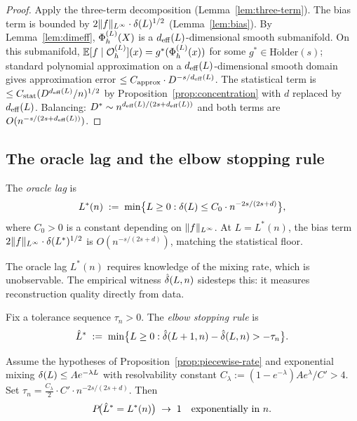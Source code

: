 \begin{proof}
Apply the three-term decomposition (Lemma~\ref{lem:three-term}).
The bias term is bounded by $2\|f\|_{L^{\infty}} \cdot \delta(L)^{1/2}$
(Lemma~\ref{lem:bias}).
By Lemma~\ref{lem:dimeff}, $\Phi_h^{(L)}(X)$ is a $d_{\mathrm{eff}}(L)$-dimensional smooth
submanifold.
On this submanifold, $\mathbb{E}[f \mid \mathcal{O}_h^{(L)}](x) = g^*(\Phi_h^{(L)}(x))$ for some
$g^* \in \mathrm{H\ddot{o}lder}(s)$; standard polynomial approximation on a
$d_{\mathrm{eff}}(L)$-dimensional smooth domain gives approximation error
$\leq C_{\mathrm{approx}} \cdot D^{-s/d_{\mathrm{eff}}(L)}$.
The statistical term is $\leq C_{\mathrm{stat}}(D^{d_{\mathrm{eff}}(L)}/n)^{1/2}$ by
Proposition~\ref{prop:concentration} with $d$ replaced by $d_{\mathrm{eff}}(L)$.
Balancing: $D^* \sim n^{d_{\mathrm{eff}}(L)/(2s+d_{\mathrm{eff}}(L))}$ and both terms are
$O(n^{-s/(2s+d_{\mathrm{eff}}(L))})$.
\end{proof}

\subsection{The oracle lag and the elbow stopping rule}

\begin{definition}
\label{def:oracle-lag}
The \emph{oracle lag} is
\[
  L^*(n) \;:=\; \min\bigl\{L \geq 0 : \delta(L) \leq C_0 \cdot n^{-2s/(2s+d)}\bigr\},
\]
where $C_0 > 0$ is a constant depending on $\|f\|_{L^{\infty}}$.
At $L = L^*(n)$, the bias term $2\|f\|_{L^{\infty}} \cdot \delta(L^*)^{1/2}$
is $O(n^{-s/(2s+d)})$, matching the statistical floor.
\end{definition}

The oracle lag $L^*(n)$ requires knowledge of the mixing rate, which is
unobservable.
The empirical witness $\hat{\delta}(L,n)$ sidesteps this: it measures reconstruction
quality directly from data.

\begin{definition}
\label{def:elbow}
Fix a tolerance sequence $\tau_n > 0$.
The \emph{elbow stopping rule} is
\[
  \hat{L}^* \;:=\; \min\bigl\{L \geq 0 :
    \hat{\delta}(L+1,n) - \hat{\delta}(L,n) > -\tau_n\bigr\}.
\]
\end{definition}

\begin{theorem}
\label{thm:elbow}
Assume the hypotheses of Proposition~\ref{prop:piecewise-rate} and
exponential mixing $\delta(L) \leq A e^{-\lambda L}$ with resolvability constant
$C_\lambda := (1-e^{-\lambda}) A e^\lambda / C' > 4$.
Set $\tau_n = \frac{C_\lambda}{2} \cdot C' \cdot n^{-2s/(2s+d)}$.
Then
\[
  P\!\bigl(\hat{L}^* = L^*(n)\bigr) \;\to\; 1
  \quad\text{exponentially in } n.
\]
\end{theorem}

